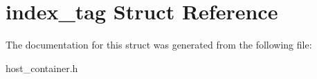 \hypertarget{structindex__tag}{}\section{index\+\_\+tag Struct Reference}
\label{structindex__tag}


The documentation for this struct was generated from the following file\+:\begin{DoxyCompactItemize}
\item 
host\+\_\+container.\+h\end{DoxyCompactItemize}
